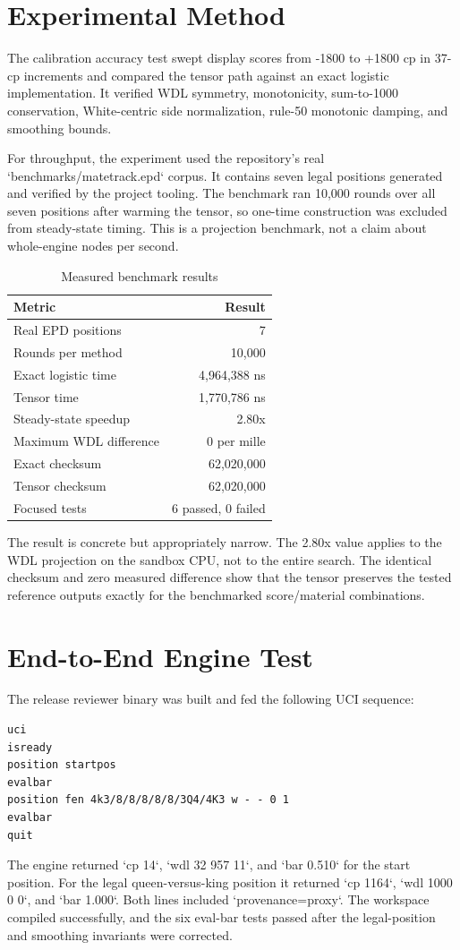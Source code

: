 \documentclass[10pt,conference]{IEEEtran}
\begin{document}
\section{Experimental Method}
The calibration accuracy test swept display scores from -1800 to +1800 cp in 37-cp increments and compared the tensor path against an exact logistic implementation. It verified WDL symmetry, monotonicity, sum-to-1000 conservation, White-centric side normalization, rule-50 monotonic damping, and smoothing bounds.

For throughput, the experiment used the repository's real `benchmarks/matetrack.epd` corpus. It contains seven legal positions generated and verified by the project tooling. The benchmark ran 10,000 rounds over all seven positions after warming the tensor, so one-time construction was excluded from steady-state timing. This is a projection benchmark, not a claim about whole-engine nodes per second.

\begin{table}[t]
\centering
\caption{Measured benchmark results}
\label{tab:results}
\begin{tabular}{lr}
\toprule
Metric & Result\\
\midrule
Real EPD positions & 7\\
Rounds per method & 10,000\\
Exact logistic time & 4,964,388 ns\\
Tensor time & 1,770,786 ns\\
Steady-state speedup & 2.80x\\
Maximum WDL difference & 0 per mille\\
Exact checksum & 62,020,000\\
Tensor checksum & 62,020,000\\
Focused tests & 6 passed, 0 failed\\
\bottomrule
\end{tabular}
\end{table}

The result is concrete but appropriately narrow. The 2.80x value applies to the WDL projection on the sandbox CPU, not to the entire search. The identical checksum and zero measured difference show that the tensor preserves the tested reference outputs exactly for the benchmarked score/material combinations.

\section{End-to-End Engine Test}
The release reviewer binary was built and fed the following UCI sequence:
\begin{verbatim}
uci
isready
position startpos
evalbar
position fen 4k3/8/8/8/8/8/3Q4/4K3 w - - 0 1
evalbar
quit
\end{verbatim}
The engine returned `cp 14`, `wdl 32 957 11`, and `bar 0.510` for the start position. For the legal queen-versus-king position it returned `cp 1164`, `wdl 1000 0 0`, and `bar 1.000`. Both lines included `provenance=proxy`. The workspace compiled successfully, and the six eval-bar tests passed after the legal-position and smoothing invariants were corrected.
\end{document}
